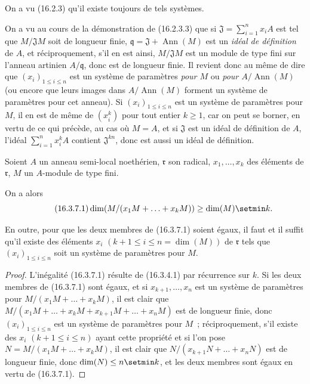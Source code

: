 On a vu (16.2.3) qu'il existe toujours de tels systèmes.

On a vu au cours de la démonstration de (16.2.3.3) que si
$\mathfrak{J}=\sum_{i=1}^n x_iA$ est tel que $M/\mathfrak{J}M$ soit de
longueur finie, $\mathfrak{q}=\mathfrak{J}+\operatorname{Ann}(M)$ est un
\emph{idéal de définition} de $A$, et réciproquement, s'il en est ainsi,
$M/\mathfrak{J}M$ est un module de type fini sur l'anneau artinien
$A/\mathfrak{q}$, donc est de longueur finie. Il revient donc au même de dire
que $(x_i)_{1\leq i\leq n}$ est un système de paramètres \emph{pour $M$} ou
\emph{pour $A/\operatorname{Ann}(M)$} (ou encore que leurs images dans
$A/\operatorname{Ann}(M)$ forment un système de paramètres pour cet anneau).
Si $(x_i)_{1\leq i\leq n}$ est un système de paramètres pour $M$, il en est de
même de $(x_i^k)$ pour tout entier $k\geq1$, car on peut se borner, en vertu de
ce qui précède, au cas où $M=A$, et si $\mathfrak{J}$ est un idéal de
définition de $A$, l'idéal $\sum_{i=1}^n x_i^kA$ contient
$\mathfrak{J}^{kn}$, donc est aussi un idéal de définition.

\begin{proposition}[16.3.7]
\label{0.16.3.7-fr}
Soient $A$ un anneau semi-local noethérien, $\mathfrak{r}$ son radical,
$x_1,\ldots,x_k$ des éléments de $\mathfrak{r}$, $M$ un $A$-module de type
fini.

On a alors
\begin{equation}
\label{0.16.3.7.1-fr}
\tag{16.3.7.1}
  \dim(M/(x_1M+\ldots+x_kM))\geq\dim(M)\setmin k.
\end{equation}

En outre, pour que les deux membres de \textup{(16.3.7.1)} soient égaux, il faut et il
suffit qu'il existe des éléments $x_i$
$(k+1\leq i\leq n=\dim(M))$ de $\mathfrak{r}$ tels que
$(x_i)_{1\leq i\leq n}$ soit un système de paramètres pour $M$.
\end{proposition}

\begin{proof}
L'inégalité (16.3.7.1) résulte de (16.3.4.1) par récurrence sur $k$. Si les
deux membres de (16.3.7.1) sont égaux, et si $x_{k+1},\ldots,x_n$ est un
système de paramètres pour $M/(x_1M+\ldots+x_kM)$, il est clair que
$M/(x_1M+\ldots+x_kM+x_{k+1}M+\ldots+x_nM)$ est de longueur finie, donc
$(x_i)_{1\leq i\leq n}$ est un système de paramètres pour $M$~;
réciproquement, s'il existe des $x_i$ $(k+1\leq i\leq n)$ ayant cette
propriété et si l'on pose $N=M/(x_1M+\ldots+x_kM)$, il est clair que
$N/(x_{k+1}N+\ldots+x_nN)$ est de longueur finie, donc
$\dim(N)\leq n\setmin k$, et les deux membres sont égaux en vertu de (16.3.7.1).
\end{proof}


